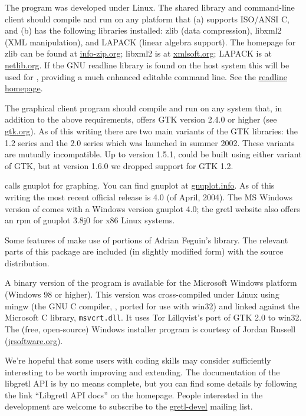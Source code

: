 The program was developed under Linux. The shared library and
command-line client should compile and run on any platform that (a)
supports ISO/ANSI C, and (b) has the following libraries installed:
zlib (data compression), libxml2 (XML manipulation), and LAPACK
(linear algebra support). The homepage for zlib can be found at
\href{http://www.info-zip.org/pub/infozip/zlib/}{info-zip.org};
libxml2 is at \href{http://xmlsoft.org/}{xmlsoft.org}; LAPACK is at
\href{http://www.netlib.org/lapack/}{netlib.org}. If the GNU readline
library is found on the host system this will be used for
, providing a much enhanced editable command line.  See
the
\href{http://cnswww.cns.cwru.edu/~chet/readline/rltop.html}{readline
  homepage}.

The graphical client program should compile and run on any system
that, in addition to the above requirements, offers GTK version 2.4.0
or higher (see \href{http://www.gtk.org/}{gtk.org}).  As of this
writing there are two main variants of the GTK libraries: the 1.2
series and the 2.0 series which was launched in summer 2002.  These
variants are mutually incompatible.  Up to version 1.5.1, 
could be built using either variant of GTK, but at version 1.6.0 we
dropped support for GTK 1.2.
  
 calls gnuplot for graphing. You can find gnuplot at
\href{http://www.gnuplot.info/}{gnuplot.info}.  As of this writing the
most recent official release is 4.0 (of April, 2004).  The MS Windows
version of  comes with a Windows version gnuplot 4.0; the
gretl website also offers an rpm of gnuplot 3.8j0 for x86 Linux
systems.
  
Some features of  make use of portions of Adrian Feguin's
 library.  The relevant parts of this package are
included (in slightly modified form) with the  source
distribution.
  
A binary version of the program is available for the Microsoft Windows
platform (Windows 98 or higher). This version was cross-compiled under
Linux using mingw (the GNU C compiler, , ported for use with
win32) and linked against the Microsoft C library, \verb+msvcrt.dll+.
It uses Tor Lillqvist's port of GTK 2.0 to win32.  The (free,
open-source) Windows installer program is courtesy of Jordan Russell
(\href{http://www.jrsoftware.org/}{jrsoftware.org}).

We're hopeful that some users with coding skills may consider
 sufficiently interesting to be worth improving and
extending.  The documentation of the libgretl API is by no means
complete, but you can find some details by following the link
``Libgretl API docs'' on the  homepage. People interested
in the  development are welcome to subscribe to the
\href{http://gretl.sourceforge.net/lists.html}{gretl-devel} mailing
list.

